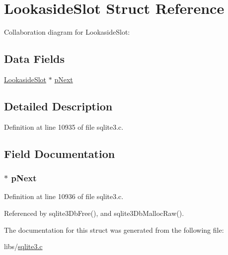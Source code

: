 \hypertarget{struct_lookaside_slot}{}\section{Lookaside\+Slot Struct Reference}
\label{struct_lookaside_slot}


Collaboration diagram for Lookaside\+Slot\+:
\subsection*{Data Fields}
\begin{DoxyCompactItemize}
\item 
\hyperlink{struct_lookaside_slot}{Lookaside\+Slot} $\ast$ \hyperlink{struct_lookaside_slot_a96094d37844e808069b708e09ad8926e}{p\+Next}
\end{DoxyCompactItemize}


\subsection{Detailed Description}


Definition at line 10935 of file sqlite3.\+c.



\subsection{Field Documentation}
\hypertarget{struct_lookaside_slot_a96094d37844e808069b708e09ad8926e}{}
\subsubsection[{p\+Next}]{$\ast$ p\+Next}\label{struct_lookaside_slot_a96094d37844e808069b708e09ad8926e}


Definition at line 10936 of file sqlite3.\+c.



Referenced by sqlite3\+Db\+Free(), and sqlite3\+Db\+Malloc\+Raw().



The documentation for this struct was generated from the following file\+:\begin{DoxyCompactItemize}
\item 
libs/\hyperlink{sqlite3_8c}{sqlite3.\+c}\end{DoxyCompactItemize}
